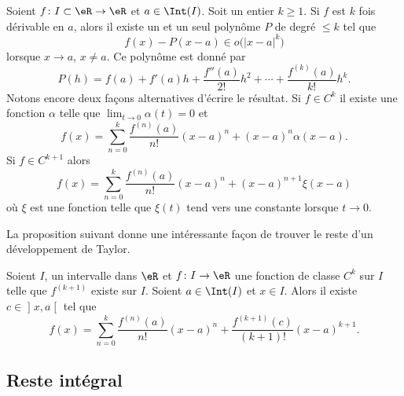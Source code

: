 \begin{proposition}     \label{PropDevTaylorPol}
    Soient $f\colon I\subset\eR\to \eR$ et $a\in\Int(I)$. Soit un entier $k\geq 1$. Si $f$ est $k$ fois dérivable en $a$, alors il existe un et un seul polynôme $P$ de degré $\leq k$ tel que
    \begin{equation}
        f(x)-P(x-a)\in o\big( | x-a |^k \big)
    \end{equation}
    lorsque $x\to a$, $x\neq a$. Ce polynôme  est donné par
    \begin{equation}
        P(h)=f(a)+f'(a)h+\frac{ f''(a) }{ 2! }h^2+\cdots+\frac{ f^{(k)}(a) }{ k! }h^k.
    \end{equation}
    Notons encore deux façons alternatives d'écrire le résultat. Si \( f\in C^k\) il existe une fonction \( \alpha\) telle que \( \lim_{t\to 0} \alpha(t)=0\) et
    \begin{equation}
        f(x)=\sum_{n=0}^k\frac{ f^{(n)}(a) }{ n! }(x-a)^n+(x-a)^n\alpha(x-a).
    \end{equation}
    Si \( f\in C^{k+1}\) alors
    \begin{equation}        \label{EquQtpoN}
        f(x)=\sum_{n=0}^k\frac{ f^{(n)}(a) }{ n! }(x-a)^n+(x-a)^{n+1}\xi(x-a)
    \end{equation}
    où \( \xi\) est une fonction telle que \( \xi(t)\) tend vers une constante lorsque \( t\to 0\).
\end{proposition}

La proposition suivant donne une intéressante façon de trouver le reste d'un développement de Taylor.
\begin{proposition}     \label{PropResteTaylorc}
Soient $I$, un intervalle dans $\eR$ et $f\colon I\to \eR$ une fonction de classe $C^k$ sur $I$ telle que $f^{(k+1)}$ existe sur $I$. Soient $a\in\Int(I)$ et $x\in I$. Alors il existe $c\in\mathopen] x , a \mathclose[$ tel que
\begin{equation}
    f(x)=\sum_{n=0}^k\frac{ f^{(n)}(a) }{ n! }(x-a)^n+\frac{ f^{(k+1)}(c) }{ (k+1)! }(x-a)^{k+1}.
\end{equation}
\end{proposition}

\subsection{Reste intégral}

